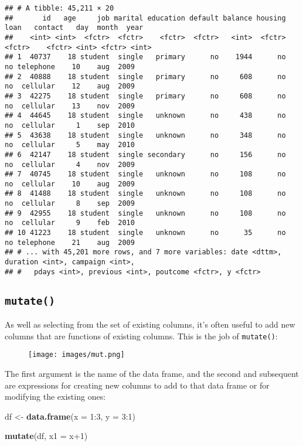 \documentclass[]{book}
\newenvironment{Shaded}{\begin{snugshade}}{\end{snugshade}}
\newcommand{\KeywordTok}[1]{\textcolor[rgb]{0.13,0.29,0.53}{\textbf{{#1}}}}
\newcommand{\DataTypeTok}[1]{\textcolor[rgb]{0.13,0.29,0.53}{{#1}}}
\newcommand{\DecValTok}[1]{\textcolor[rgb]{0.00,0.00,0.81}{{#1}}}
\newcommand{\StringTok}[1]{\textcolor[rgb]{0.31,0.60,0.02}{{#1}}}
\newcommand{\NormalTok}[1]{{#1}}
\begin{document}
\begin{verbatim}
## # A tibble: 45,211 × 20
##       id   age     job marital education default balance housing   loan   contact   day  month  year
##    <int> <int>  <fctr>  <fctr>    <fctr>  <fctr>   <int>  <fctr> <fctr>    <fctr> <int> <fctr> <int>
## 1  40737    18 student  single   primary      no    1944      no     no telephone    10    aug  2009
## 2  40888    18 student  single   primary      no     608      no     no  cellular    12    aug  2009
## 3  42275    18 student  single   primary      no     608      no     no  cellular    13    nov  2009
## 4  44645    18 student  single   unknown      no     438      no     no  cellular     1    sep  2010
## 5  43638    18 student  single   unknown      no     348      no     no  cellular     5    may  2010
## 6  42147    18 student  single secondary      no     156      no     no  cellular     4    nov  2009
## 7  40745    18 student  single   unknown      no     108      no     no  cellular    10    aug  2009
## 8  41488    18 student  single   unknown      no     108      no     no  cellular     8    sep  2009
## 9  42955    18 student  single   unknown      no     108      no     no  cellular     9    feb  2010
## 10 41223    18 student  single   unknown      no      35      no     no telephone    21    aug  2009
## # ... with 45,201 more rows, and 7 more variables: date <dttm>, duration <int>, campaign <int>,
## #   pdays <int>, previous <int>, poutcome <fctr>, y <fctr>
\end{verbatim}

\clearpage

\subsection{\texorpdfstring{\texttt{mutate()}}{mutate()}}\label{mutate}

As well as selecting from the set of existing columns, it's often useful
to add new columns that are functions of existing columns. This is the
job of \texttt{mutate()}:

\begin{figure}[htbp]
\centering
\texttt{[image: images/mut.png]}
\caption{}
\end{figure}

The first argument is the name of the data frame, and the second and
subsequent are expressions for creating new columns to add to that data
frame or for modifying the existing ones:

\begin{Shaded}
\begin{Highlighting}[]
\NormalTok{df <-}\StringTok{ }\KeywordTok{data.frame}\NormalTok{(}\DataTypeTok{x =} \DecValTok{1}\NormalTok{:}\DecValTok{3}\NormalTok{, }\DataTypeTok{y =} \DecValTok{3}\NormalTok{:}\DecValTok{1}\NormalTok{)}

\KeywordTok{mutate}\NormalTok{(df, }\DataTypeTok{x1 =} \NormalTok{x}\DecValTok{+1}\NormalTok{)}
\end{Highlighting}
\end{Shaded}
\end{document}
